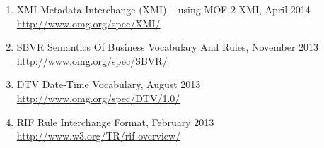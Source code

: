 \documentclass[10pt, a4paper]{isov2}
\begin{document}
\begin{enumerate}[label=\bfseries NR\arabic*]
\item{XMI} {Metadata Interchange (XMI) – using MOF 2 XMI, April 2014} \\ \url{http://www.omg.org/spec/XMI/}\label{nref-XMI}
\item{SBVR} {Semantics Of Business Vocabulary And Rules, November 2013} \\ \url{http://www.omg.org/spec/SBVR/}\label{nref-SBVR}
\item{DTV} {Date-Time Vocabulary, August 2013} \\ \url{http://www.omg.org/spec/DTV/1.0/}\label{nref-DTV}
\item{RIF} {Rule Interchange Format, February 2013} \\ \url{http://www.w3.org/TR/rif-overview/}\label{nref-RIF}
\end{enumerate}



\cleardoublepage
{}\label{terms-and-defs}



\end{document}
